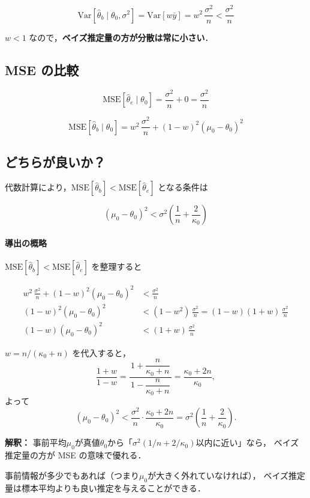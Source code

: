 \documentclass[lualatex,ja=standard,a4paper,12pt]{bxjsarticle}
\begin{document}
\[
  \mathrm{Var}[\hat{\theta}_b \mid \theta_0, \sigma^2]
  = \mathrm{Var}[w\bar{y}] = w^2\,\frac{\sigma^2}{n}
  < \frac{\sigma^2}{n}
\]

$w < 1$ なので，\textbf{ベイズ推定量の方が分散は常に小さい}．

\subsection*{MSE の比較}

\[
  \mathrm{MSE}[\hat{\theta}_e \mid \theta_0]
  = \frac{\sigma^2}{n} + 0
  = \frac{\sigma^2}{n}
\]

\[
  \mathrm{MSE}[\hat{\theta}_b \mid \theta_0]
  = w^2\,\frac{\sigma^2}{n} + (1-w)^2(\mu_0 - \theta_0)^2
\]

\subsection*{どちらが良いか？}

代数計算により，$\mathrm{MSE}[\hat{\theta}_b] < \mathrm{MSE}[\hat{\theta}_e]$ となる条件は

\[
  \boxed{
    (\mu_0 - \theta_0)^2
    < \sigma^2\!\left(\frac{1}{n} + \frac{2}{\kappa_0}\right)
  }
\]

\paragraph{導出の概略}

$\mathrm{MSE}[\hat{\theta}_b] < \mathrm{MSE}[\hat{\theta}_e]$ を整理すると

\begin{align*}
  w^2\,\frac{\sigma^2}{n} + (1-w)^2(\mu_0-\theta_0)^2
  &< \frac{\sigma^2}{n} \\
  (1-w)^2(\mu_0-\theta_0)^2
  &< (1-w^2)\,\frac{\sigma^2}{n}
   = (1-w)(1+w)\,\frac{\sigma^2}{n} \\
  (1-w)(\mu_0-\theta_0)^2
  &< (1+w)\,\frac{\sigma^2}{n}
\end{align*}

$w = n/(\kappa_0+n)$ を代入すると，
\[
  \frac{1+w}{1-w}
  = \frac{\,1 + \dfrac{n}{\kappa_0+n}\,}{1 - \dfrac{n}{\kappa_0+n}}
  = \frac{\kappa_0+2n}{\kappa_0},
\]
よって
\[
  (\mu_0-\theta_0)^2
  < \frac{\sigma^2}{n} \cdot \frac{\kappa_0+2n}{\kappa_0}
  = \sigma^2\!\left(\frac{1}{n} + \frac{2}{\kappa_0}\right).
\]

\begin{pointbox}
\textbf{解釈：}
事前平均$\mu_0$が真値$\theta_0$から「$\sigma^2(1/n + 2/\kappa_0)$以内に近い」なら，
ベイズ推定量の方が MSE の意味で優れる．

\medskip
事前情報が多少でもあれば（つまり$\mu_0$が大きく外れていなければ），
ベイズ推定量は標本平均よりも良い推定を与えることができる．
\end{pointbox}
\end{document}
